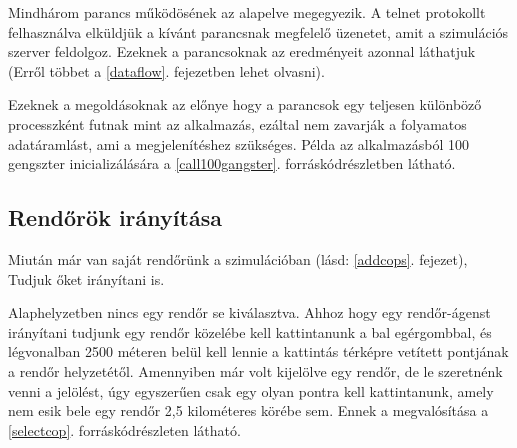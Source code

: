 \documentclass[a4paper,12pt]{report}
\begin{document}




Mindhárom parancs működösének az alapelve megegyezik. A telnet protokollt felhasználva elküldjük a kívánt parancsnak megfelelő üzenetet, amit a szimulációs szerver feldolgoz. Ezeknek a parancsoknak az eredményeit azonnal láthatjuk (Erről többet a \ref{dataflow}. fejezetben lehet olvasni).

\vspace{2mm}
Ezeknek a megoldásoknak az előnye hogy a parancsok egy teljesen különböző processzként futnak mint az alkalmazás, ezáltal nem zavarják a folyamatos adatáramlást, ami a megjelenítéshez szükséges. Példa az alkalmazásból 100 gengszter inicializálására a \ref{call100gangster}. forráskódrészletben látható.



\subsection{Rendőrök irányítása}
\label{controlcops}

Miután már van saját rendőrünk a szimulációban (lásd: \ref{addcops}. fejezet), Tudjuk őket irányítani is.

\vspace{2mm}
Alaphelyzetben nincs egy rendőr se kiválasztva. Ahhoz hogy egy rendőr-ágenst irányítani tudjunk egy rendőr közelébe kell kattintanunk a bal egérgombbal, és légvonalban 2500 méteren belül kell lennie a kattintás térképre vetített pontjának a rendőr helyzetétől. Amennyiben már volt kijelölve egy rendőr, de le szeretnénk venni a jelölést, úgy egyszerűen csak egy olyan pontra kell kattintanunk, amely nem esik bele egy rendőr 2,5 kilométeres körébe sem. Ennek a megvalósítása a \ref{selectcop}. forráskódrészleten látható.



\newpage
\end{document}
